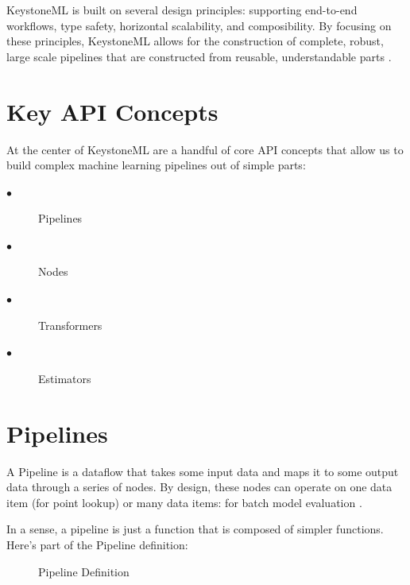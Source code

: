 \documentclass[9pt,twocolumn,twoside]{../../styles/osajnl}
\begin{document}
KeystoneML is built on several design principles: supporting
end-to-end workflows, type safety, horizontal scalability, and
composibility. By focusing on these principles, KeystoneML allows for the
construction of complete, robust, large scale pipelines that are
constructed from reusable, understandable parts \cite{www-keystoneml1} .

\section{Key API Concepts}
At the center of KeystoneML are a handful of core API concepts that
allow us to build complex machine learning pipelines out of simple
parts:
\begin{description}

\item[$\bullet$] Pipelines
\item[$\bullet$] Nodes
\item[$\bullet$] Transformers
\item[$\bullet$] Estimators
  
 
\end{description}


\section{Pipelines}

A Pipeline is a dataflow that takes some input data and maps it to
some output data through a series of nodes. By design, these nodes can
operate on one data item (for point lookup) or many data items: for
batch model evaluation \cite{www-keystoneml1} .

In a sense, a pipeline is just a function that is composed of simpler
functions. Here’s part of the Pipeline definition:

\begin{figure}[htbp]
\centering
{}
\caption{Pipeline Definition}
\label{fig:Pipeline Definition}
\end{figure}
\end{document}

